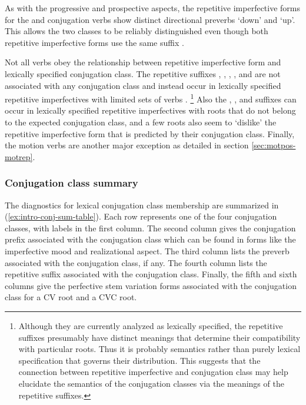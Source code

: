 \documentclass[12pt,letterpaper,oneside,article]{memoir}
\begin{document}
As with the progressive and prospective aspects, the repetitive imperfective forms for the  and  conjugation verbs show distinct directional preverbs  ‘down’ and  ‘up’.
This allows the two classes to be reliably distinguished even though both repetitive imperfective forms use the same suffix .

Not all verbs obey the relationship between repetitive imperfective form and lexically specified conjugation class.
The repetitive suffixes , , , , and  are not associated with any conjugation class and instead occur in lexically specified repetitive imperfectives with limited sets of verbs \parencite[532–535]{crippen:2019}.%
\footnote{Although they are currently analyzed as lexically specified, the repetitive suffixes presumably have distinct meanings that determine their compatibility with particular roots.
Thus it is probably semantics rather than purely lexical specification that governs their distribution.
This suggests that the connection between repetitive imperfective and conjugation class may help elucidate the semantics of the conjugation classes via the meanings of the repetitive suffixes.}
Also the , , and  suffixes can occur in lexically specified repetitive imperfectives with roots that do not belong to the expected conjugation class, and a few roots also seem to ‘dislike’ the repetitive imperfective form that is predicted by their conjugation class.
Finally, the motion verbs are another major exception as detailed in section \ref{sec:motpos-motrep}.

\subsubsection{Conjugation class summary}\label{sec:intro-conj-sum}

The diagnostics for lexical conjugation class membership are summarized in (\ref{ex:intro-conj-sum-table}).
Each row represents one of  the four conjugation classes, with labels in the first column.
The second column gives the conjugation prefix associated with the conjugation class which can be found in forms like the imperfective mood and realizational aspect.
The third column lists the preverb associated with the conjugation class, if any.
The fourth column lists the repetitive suffix associated with the conjugation class.
Finally, the fifth and sixth columns give the perfective stem variation forms associated with the conjugation class for a CV root and a CVC root.
\end{document}
